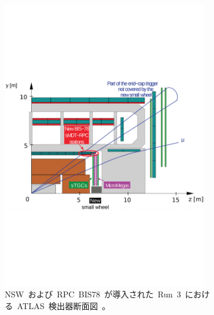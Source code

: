 \begin{figure}[H]
        \centering   
        \includegraphics[width=0.8\textwidth,page=1]{img/pdf/bisbis.pdf}
        \caption[NSW~および~RPC~BIS78~が導入された~Run~3~における~ATLAS~検出器断面図]{NSW~および~RPC~BIS78~が導入された~Run~3~における~ATLAS~検出器断面図~\cite{TR:07}。}
        \label{fig:cut3}
\end{figure}

